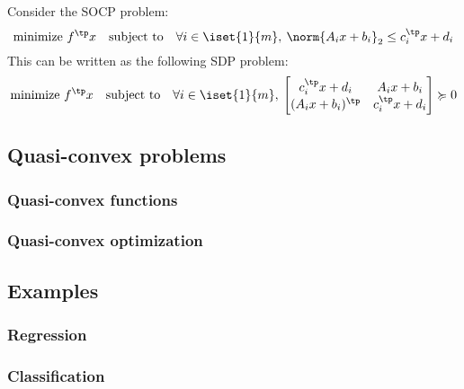\begin{property}
    Consider the SOCP problem:
    \begin{equation*}
        \text{minimize } f^\tp x \quad\text{subject to}\quad \forall i\in\iset{1}{m}, \: \norm{A_ix+b_i}_2\leq c_i^\tp x+d_i
    \end{equation*}
    This can be written as the following SDP problem:
    \begin{equation*}
        \text{minimize } f^\tp x \quad\text{subject to}\quad \forall i\in\iset{1}{m}, \: \begin{bmatrix}
            c_i^\tp x+d_i & A_ix+b_i\\
            (A_ix+b_i)^\tp & c_i^\tp x+d_i
        \end{bmatrix}\succcurlyeq0
    \end{equation*}
\end{property}

\subsection{Quasi-convex problems}
\subsubsection{Quasi-convex functions}
\subsubsection{Quasi-convex optimization}
\subsection{Examples}
\subsubsection{Regression}
\subsubsection{Classification}